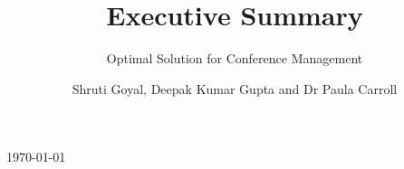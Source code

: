 \documentclass[paper=a4, fontsize=11pt]{scrartcl} %
\begin{document}
\begin{titlepage}
\vspace{3cm}
{\large \today}\\[1cm] %
\vfill %
\end{titlepage}




\subtitle{\normalsize{Optimal Solution for Conference Management}}
\title{Executive Summary}
\author{\small{Shruti Goyal, Deepak Kumar Gupta and Dr Paula Carroll}}
\date{}
\maketitle
\end{document}
